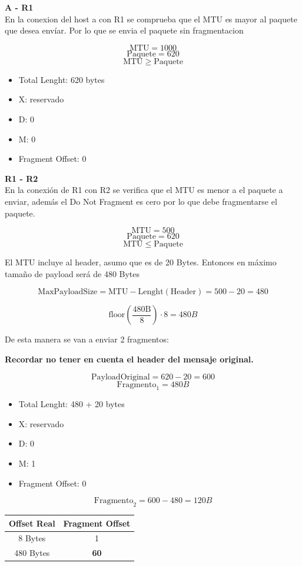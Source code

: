 \textbf{A - R1}\\
En la conexion del host a con R1 se comprueba que el MTU es mayor al paquete que desea envíar. Por lo que se envia el paquete sin fragmentacion

$$ \mathrm{MTU} = 1000 $$
$$ \mathrm{Paquete} = 620 $$
$$ \mathrm{MTU}  \geq \mathrm{Paquete}$$

\begin{itemize}
    \item Total Lenght: 620 bytes
    \item X: reservado
    \item D: 0
    \item M: 0
    \item Fragment Offset: 0
\end{itemize}


\textbf{R1 - R2}\\

En la conexión de R1 con R2 se verifica que el MTU es menor a el paquete a enviar, además el Do Not Fragment es cero por lo que debe fragmentarse el paquete.

$$ \mathrm{MTU} = 500 $$
$$ \mathrm{Paquete} = 620 $$
$$ \mathrm{MTU}  \le \mathrm{Paquete}$$

El MTU incluye al header, asumo que es de 20 Bytes. Entonces en máximo tamaño de payload será de 480 Bytes

$$ \mathrm{MaxPayloadSize} = \mathrm{MTU} - \mathrm{Lenght}(\mathrm{Header}) = 500 - 20 = 480 $$

$$\mathrm{floor}(\frac{\mathrm{480 B}}{8}) \cdot 8 = 480 B$$

De esta manera se van a enviar 2 fragmentos:

\textbf{Recordar no tener en cuenta el header del mensaje original.}


$$ \mathrm{PayloadOriginal} = 620 - 20 = 600 $$
$$\mathrm{Fragmento}_1 = 480 B$$
\begin{itemize}
    \item Total Lenght: 480 + 20 bytes
    \item X: reservado
    \item D: 0
    \item M: 1
    \item Fragment Offset: 0
\end{itemize}

$$\mathrm{Fragmento}_2 = 600 - 480 = 120 B$$

\begin{center}
    \begin{tabular}{c|c}
        Offset Real & Fragment Offset \\
        \hline
        \hline
        8 Bytes & 1 \\
        \hline
        480 Bytes & \textbf{60}
    \end{tabular}
\end{center}

